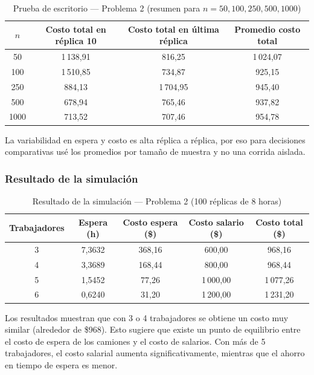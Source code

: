 \documentclass[12pt,a4paper]{article}
\begin{document}
\begin{table}[H]
\centering
\caption{Prueba de escritorio — Problema 2 (resumen para $n=50,100,250,500,1000$)}
\begin{tabular}{cccc}
\toprule
\textbf{$n$} & \textbf{Costo total en réplica 10} & \textbf{Costo total en última réplica} & \textbf{Promedio costo total} \\
\midrule
50 & 1\,138,91 & 816,25 & 1\,024,07 \\
100 & 1\,510,85 & 734,87 & 925,15 \\
250 & 884,13 & 1\,704,95 & 945,40 \\
500 & 678,94 & 765,46 & 937,82 \\
1000 & 713,52 & 707,46 & 954,78 \\
\bottomrule
\end{tabular}
\end{table}

\begin{notabox}
La variabilidad en espera y costo es alta réplica a réplica, por eso para decisiones comparativas usé los promedios por tamaño de muestra y no una corrida aislada.
\end{notabox}

\subsubsection{Resultado de la simulación}

\begin{table}[H]
\centering
\caption{Resultado de la simulación — Problema 2 (100 réplicas de 8 horas)}
\small
\begin{tabular}{ccccc}
\toprule
\textbf{Trabajadores} & \textbf{Espera (h)} & \textbf{Costo espera (\$)} & \textbf{Costo salario (\$)} & \textbf{Costo total (\$)} \\
\midrule
3 & 7,3632 & 368,16 & 600,00 & 968,16 \\
4 & 3,3689 & 168,44 & 800,00 & 968,44 \\
5 & 1,5452 & 77,26  & 1\,000,00 & 1\,077,26 \\
6 & 0,6240 & 31,20  & 1\,200,00 & 1\,231,20 \\
\bottomrule
\end{tabular}
\end{table}

\begin{notabox}
Los resultados muestran que con 3 o 4 trabajadores se obtiene un costo muy similar (alrededor de \$968). Esto sugiere que existe un punto de equilibrio entre el costo de espera de los camiones y el costo de salarios. Con más de 5 trabajadores, el costo salarial aumenta significativamente, mientras que el ahorro en tiempo de espera es menor.
\end{notabox}
\end{document}
